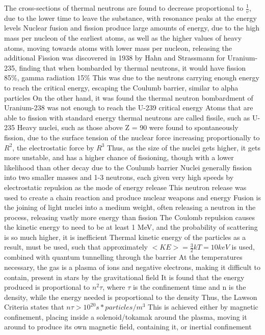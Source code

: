 \documentclass[11 pt, twoside]{article}
\newenvironment{outline*}
{
	\begin{outline}[enumerate]
	}
	{\end{outline}
}
\begin{document}
\begin{outline*}
		\3 The cross-sections of thermal neutrons are found to decrease proportional to $\frac{1}{v}$, due to the lower time to leave the substance, with resonance peaks at the energy levels
\1 Nuclear fusion and fission produce large amounts of energy, due to the high mass per nucleon of the earliest atoms, as well as the higher values of heavy atoms, moving towards atoms with lower mass per nucleon, releasing the additional
	\2 Fission was discovered in 1938 by Hahn and Strassmann for Uranium-235, finding that when bombarded by thermal neutrons, it would have fission 85\%, gamma radiation 15\%
		\3 This was due to the neutrons carrying enough energy to reach the critical energy, escaping the Coulumb barrier, similar to alpha particles
		\3 On the other hand, it was found the thermal neutron bombardment of Uranium-238 was not enough to reach the U-239 critical energy
			\4 Atoms that are able to fission with standard energy thermal neutrons are called fissile, such as U-235
		\3 Heavy nuclei, such as those above Z = 90 were found to spontaneously fission, due to the surface tension of the nuclear force increasing proportionally to $R^2$, the electrostatic force by $R^3$
			\4 Thus, as the size of the nuclei gets higher, it gets more unstable, and has a higher chance of fissioning, though with a lower likelihood than other decay due to the Coulumb barrier
		\3 Nuclei generally fission into two smaller masses and 1-3 neutrons, each given very high speeds by electrostatic repulsion as the mode of energy release
			\4 This neutron release was used to create a chain reaction and produce nuclear weapons and energy
	\2 Fusion is the joining of light nuclei into a medium weight, often releasing a neutron in the process, releasing vastly more energy than fission
		\3 The Coulomb repulsion causes the kinetic energy to need to be at least 1 MeV, and the probability of scattering is so much higher, it is inefficient
		\3 Thermal kinetic energy of the particles as a result, must be used, such that approximately $<KE> = \frac{3}{2}kT = 10 keV$ is used, combined with quantum tunnelling through the barrier
			\4 At the temperatures necessary, the gas is a plasma of ions and negative electrons, making it difficult to contain, present in stars by the gravitational field
			\4 It is found that the energy produced is proportional to $n^2\tau$, where $\tau$ is the confinement time and n is the density, while the energy needed is proportional to the density
			\4 Thus, the Lawson Criteria states that $n\tau > 10^{20} s * particles/m^3$
		\3 This is achieved either by magnetic confinement, placing inside a solenoid/tokamak around the plasma, moving it around to produce its own magnetic field, containing it, or inertial confinement

\end{outline*}
\end{document}

